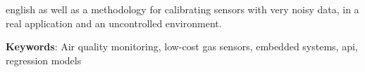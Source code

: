 \begin{resumo}[Abstract]
\begin{otherlanguage*}{english}
as well as a methodology for calibrating sensors with very noisy data, in a real application and an uncontrolled environment.

		\textbf{Keywords}: Air quality monitoring, low-cost gas sensors, embedded systems, \acrshort{api}, regression models
	\end{otherlanguage*}
\end{resumo}

{%
	\hypersetup{hidelinks}
	\listoffigures*
	\cleardoublepage
	
	\listoftables*
	\cleardoublepage
	
	
	\printnoidxglossary[type=acronym, sort=use, title=Lista de siglas, toctitle=Lista de siglas]
	\cleardoublepage

	\tableofcontents*
	\cleardoublepage
	
}%
